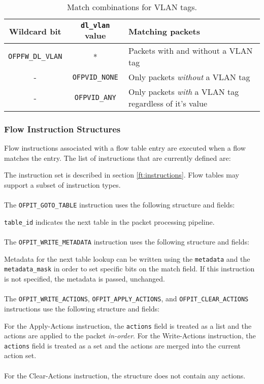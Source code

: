 \begin{table}[hbp]
\centering
\begin{tabularx}{\textwidth}{|c|c|X|}
\hline
Wildcard bit & \verb|dl_vlan| value & Matching packets \\
\hline
\verb|OFPFW_DL_VLAN| & * & Packets with and without a VLAN tag \\
\hline
- & \verb|OFPVID_NONE| & Only packets \emph{without} a VLAN tag \\
\hline
- & \verb|OFPVID_ANY| & Only packets \emph{with} a VLAN tag regardless of it's value \\
\hline
\end{tabularx}
\caption{Match combinations for VLAN tags.}
\label{table:vlan wildcards}
\end{table}

\subsubsection{Flow Instruction Structures}
Flow instructions associated with a flow table entry are executed when a flow matches the entry. The list of instructions that are currently defined are:


The instruction set is described in section \ref{ft:instructions}.  Flow tables may support a subset of instruction types.
\\\\
The \verb|OFPIT_GOTO_TABLE| instruction uses the following structure and fields:

\verb|table_id| indicates the next table in the packet processing pipeline.
\\\\
The \verb|OFPIT_WRITE_METADATA| instruction uses the following structure and fields:

Metadata for the next table lookup can be written using the \verb|metadata| and the \verb|metadata_mask| in order to set specific bits on the match field.   If this instruction is not specified, the metadata is passed, unchanged.
\\\\
The \verb|OFPIT_WRITE_ACTIONS|, \verb|OFPIT_APPLY_ACTIONS|, and \verb|OFPIT_CLEAR_ACTIONS| instructions use the following structure and fields:

For the Apply-Actions instruction, the \verb|actions| field is treated as a list and the actions are applied to the packet \emph{in-order}. For the Write-Actions instruction, the \verb|actions| field is treated as a set and the actions are merged into the current action set.
\\\\
For the Clear-Actions instruction, the structure does not contain any actions.

